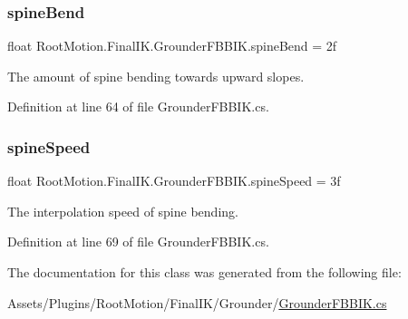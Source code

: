 \mbox{\label{class_root_motion_1_1_final_i_k_1_1_grounder_f_b_b_i_k_a3da51554df978914f32d996ee255ccaf}} 
\subsubsection{\texorpdfstring{spine\+Bend}{spineBend}}
{\footnotesize\ttfamily float Root\+Motion.\+Final\+I\+K.\+Grounder\+F\+B\+B\+I\+K.\+spine\+Bend = 2f}



The amount of spine bending towards upward slopes. 



Definition at line 64 of file Grounder\+F\+B\+B\+I\+K.\+cs.

\mbox{\label{class_root_motion_1_1_final_i_k_1_1_grounder_f_b_b_i_k_ac3f5bdf163209e90da7f12ed78f01e13}} 
\subsubsection{\texorpdfstring{spine\+Speed}{spineSpeed}}
{\footnotesize\ttfamily float Root\+Motion.\+Final\+I\+K.\+Grounder\+F\+B\+B\+I\+K.\+spine\+Speed = 3f}



The interpolation speed of spine bending. 



Definition at line 69 of file Grounder\+F\+B\+B\+I\+K.\+cs.



The documentation for this class was generated from the following file\+:\begin{DoxyCompactItemize}
\item 
Assets/\+Plugins/\+Root\+Motion/\+Final\+I\+K/\+Grounder/\mbox{\hyperlink{_grounder_f_b_b_i_k_8cs}{Grounder\+F\+B\+B\+I\+K.\+cs}}\end{DoxyCompactItemize}
